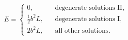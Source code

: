 \begin{equation*}
  E=\left\lbrace
\begin{aligned}
  0, &~~~~\text{degenerate solutions II},
\\
  \frac12b^2L, &~~~~\text{degenerate solutions I},
\\
  2b^2L,&~~~~\text{all other solutions}.
\end{aligned} \right.
\end{equation*}

